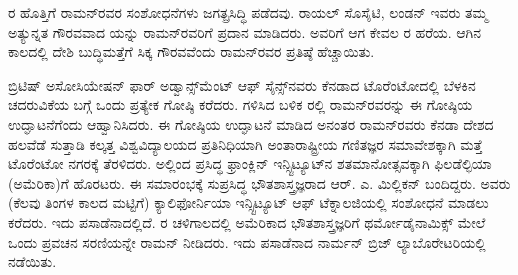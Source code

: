 ರ ಹೊತ್ತಿಗೆ ರಾಮನ್‍ರವರ ಸಂಶೋಧನೆಗಳು ಜಗತ್ಪ್ರಸಿದ್ಧಿ ಪಡೆದವು. ರಾಯಲ್ ಸೊಸೈಟಿ, ಲಂಡನ್ \enginline{-} ಇವರು ತಮ್ಮ ಅತ್ಯುನ್ನತ ಗೌರವವಾದ  ಯನ್ನು ರಾಮನ್‍ರವರಿಗೆ ಪ್ರದಾನ ಮಾಡಿದರು. ಅವರಿಗೆ ಆಗ ಕೇವಲ ರ ಹರೆಯ. ಆಗಿನ ಕಾಲದಲ್ಲಿ ದೇಶಿ ಬುದ್ಧಿಮತ್ತೆಗೆ ಸಿಕ್ಕ ಗೌರವವೆಂದು ರಾಮನ್‍ರವರ ಪ್ರತಿಷ್ಠೆ ಹೆಚ್ಚಾಯಿತು.



ಬ್ರಿಟಿಷ್ ಅಸೋಸಿಯೇಷನ್ ಫಾರ್ ಅಡ್ವಾನ್ಸ್‌ಮೆಂಟ್ ಆಫ್ ಸೈನ್ಸ್‌ನವರು ಕೆನಡಾದ ಟೊರೆಂಟೋದಲ್ಲಿ ಬೆಳಕಿನ ಚದರುವಿಕೆಯ ಬಗ್ಗೆ ಒಂದು ಪ್ರತ್ಯೇಕ ಗೋಷ್ಠಿ ಕರೆದರು.  ಗಳಿಸಿದ ಬಳಿಕ ರಲ್ಲಿ ರಾಮನ್‍ರವರನ್ನು ಈ ಗೋಷ್ಠಿಯ ಉದ್ಘಾಟನೆಗೆಂದು ಆಹ್ವಾನಿಸಿದರು. ಈ ಗೋಷ್ಠಿಯ ಉದ್ಘಾಟನೆ ಮಾಡಿದ ಅನಂತರ ರಾಮನ್‍ರವರು ಕೆನಡಾ ದೇಶದ ಹಲವೆಡೆ ಸುತ್ತಾಡಿ ಕಲ್ಕತ್ತ ವಿಶ್ವವಿದ್ಯಾಲಯದ ಪ್ರತಿನಿಧಿಯಾಗಿ ಅಂತಾರಾಷ್ಟ್ರೀಯ ಗಣಿತಜ್ಞರ ಸಮಾವೇಶಕ್ಕಾಗಿ ಮತ್ತೆ ಟೊರೆಂಟೋ ನಗರಕ್ಕೆ ತೆರಳಿದರು. ಅಲ್ಲಿಂದ ಪ್ರಸಿದ್ಧ ಫ್ರಾಂಕ್ಲಿನ್ ಇನ್ಸ್ಟಿಟ್ಯೂಟ್‍ನ ಶತಮಾನೋತ್ಸವಕ್ಕಾಗಿ ಫಿಲಡೆಲ್ಫಿಯಾ (ಅಮೆರಿಕಾ)ಗೆ ಹೊರಟರು. ಈ ಸಮಾರಂಭಕ್ಕೆ ಸುಪ್ರಸಿದ್ಧ ಭೌತಶಾಸ್ತ್ರಜ್ಞರಾದ ಆರ್. ಎ. ಮಿಲ್ಲಿಕನ್ ಬಂದಿದ್ದರು. ಅವರು (ಕೆಲವು ತಿಂಗಳ ಕಾಲದ ಮಟ್ಟಿಗೆ) ಕ್ಯಾಲಿಫೋರ್ನಿಯಾ ಇನ್ಸ್ಟಿಟ್ಯೂಟ್ ಆಫ್ ಟೆಕ್ನಾಲಜಿಯಲ್ಲಿ ಸಂಶೋಧನೆ ಮಾಡಲು ಕರೆದರು. ಇದು ಪಸಾಡೆನಾದಲ್ಲಿದೆ. ರ ಚಳಿಗಾಲದಲ್ಲಿ ಅಮೆರಿಕಾದ ಭೌತಶಾಸ್ತ್ರಜ್ಞರಿಗೆ ಥರ್ಮೋಡೈನಾಮಿಕ್ಸ್ ಮೇಲೆ ಒಂದು ಪ್ರವಚನ ಸರಣಿಯನ್ನೇ ರಾಮನ್ ನೀಡಿದರು. ಇದು ಪಸಾಡೆನಾದ ನಾರ್ಮನ್ ಬ್ರಿಜ್ ಲ್ಯಾಬೊರೇಟರಿಯಲ್ಲಿ ನಡೆಯಿತು.

